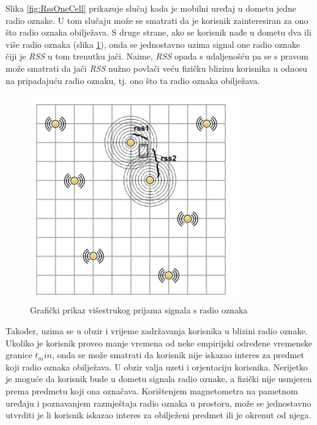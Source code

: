 \documentclass[times, utf8, diplomski, numeric]{fer}
\begin{document}
Slika \ref{fig:RssOneCell} prikazuje slučaj kada je mobilni
uređaj u dometu jedne radio oznake. U tom slučaju može se smatrati da je
korisnik zainteresiran za ono što radio oznaka obilježava. S druge strane,
ako se korisnik nađe u dometu dva ili više radio oznaka (slika
\ref{fig:RssTwoCells}), onda se jednostavno uzima signal one radio oznake čiji
je \emph{RSS} u tom trenutku jači. Naime, \emph{RSS} opada s udaljenošću pa se s
pravom može smatrati da jači \emph{RSS} nužno povlači veću fizičku blizinu
korisnika u odnosu na pripadajuću radio oznaku, tj. ono što ta radio oznaka
obilježava.

\begin{figure}[!htb]
	\centering
	\includegraphics[width=9cm]{images/gridbeacons2cells.png}
	\caption{Grafički prikaz višestrukog prijama signala s radio oznaka}
	\label{fig:RssTwoCells}
\end{figure}

Također, uzima se u obzir i vrijeme zadržavanja korisnika u blizini radio
oznake. Ukoliko je korisnik proveo manje vremena od neke empirijski određene
vremenske granice $t_min$, onda se može smatrati da korisnik nije iskazao
interes za predmet koji radio oznaka obilježava.
U obzir valja uzeti i orjentaciju korisnika. Nerijetko je moguće da korisnik
bude u dometu signala radio oznake, a fizički nije usmjeren prema predmetu koji
ona označava. Korištenjem magnetometra na pametnom uređaju i poznavanjem
razmještaja radio oznaka u prostoru, može se jednostavno utvrditi je li korisnik
iskazao interes za obilježeni predmet ili je okrenut od njega.
\end{document}

